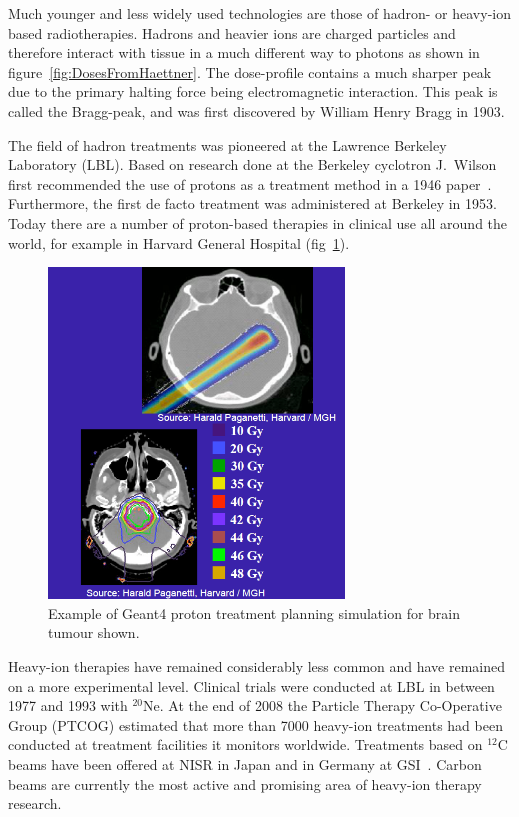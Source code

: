 Much younger and less widely used technologies are those of hadron- or heavy-ion based radiotherapies. Hadrons and heavier ions are charged particles and therefore interact with tissue in a much different way to photons as shown in figure~\ref{fig:DosesFromHaettner}. The dose-profile contains a much sharper peak due to the primary halting force being electromagnetic interaction. This peak is called the Bragg-peak, and was first discovered by William Henry Bragg in 1903.

The field of hadron treatments was pioneered at the Lawrence Berkeley Laboratory (LBL). Based on research done at the Berkeley cyclotron J.~Wilson first recommended the use of protons as a treatment method in a 1946 paper~\cite{RW46}. Furthermore, the first de facto treatment was administered at Berkeley in 1953. Today there are a number of proton-based therapies in clinical use all around the world, for example in Harvard General Hospital (fig~\ref{fig:HarvardHadron}).
\begin{figure}[!h]
\begin{center}
\includegraphics[width=0.7\textwidth]{images/HarvardHadronTreatment.png}  
\caption{\label{fig:HarvardHadron} Example of Geant4 proton treatment planning simulation for brain tumour shown.} 
\end{center}
\end{figure} 
Heavy-ion therapies have remained considerably less common and have remained on a more experimental level. Clinical trials were conducted at LBL in between 1977 and 1993 with $^{20}$Ne. At the end of 2008 the Particle Therapy Co-Operative  Group (PTCOG) estimated that more than 7000 heavy-ion treatments had been conducted at treatment facilities it monitors worldwide. Treatments based on $^{12}$C beams have been offered at NISR in Japan and in Germany at GSI~\cite{PTCOGstat}. Carbon beams are currently the most active and promising area of heavy-ion therapy research. 

